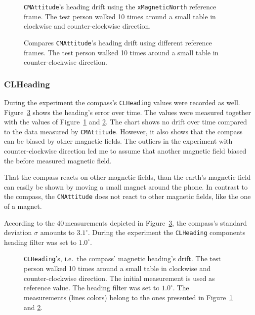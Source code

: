 \begin{figure}[htbp]
	
	\caption{\texttt{CMAttitude}'s heading drift using the \texttt{xMagneticNorth} reference frame. The test person walked 10 times around a small table in clockwise and counter-clockwise direction.}
	\label{fig:evalAttitude:xMagneticNorth}
\end{figure}

\begin{figure}[htbp]
	
	\caption{Compares \texttt{CMAttitude}'s heading drift using different reference frames. The test person walked 10 times around a small table in counter-clockwise direction.}
	\label{fig:evalAttitude:referenceframes}
\end{figure}

\subsubsection*{CLHeading}
During the experiment the compass's \texttt{CLHeading} values were recorded as well. Figure~\ref{fig:eval:compass} shows the heading's error over time. The values were measured together with the values of Figure~\ref{fig:evalAttitude:xMagneticNorth} and \ref{fig:evalAttitude:referenceframes}. The chart shows no drift over time compared to the data measured by \texttt{CMAttitude}. However, it also shows that the compass can be biased by other magnetic fields. The outliers in the experiment with counter-clockwise direction led me to assume that another magnetic field biased the before measured magnetic field.

That the compass reacts on other magnetic fields, than the earth's magnetic field can easily be shown by moving a small magnet around the phone. In contrast to the compass, the \texttt{CMAttitude} does not react to other magnetic fields, like the one of a magnet.

According to the 40\,measurements depicted in Figure~\ref{fig:eval:compass}, the compass's standard deviation $\sigma$ amounts to $3.1^{\circ}$. During the experiment the \texttt{CLHeading} components heading filter was set to $1.0^{\circ}$.


\begin{figure}[htbp]
	
	\caption{\texttt{CLHeading}'s, i.e.\ the compass' magnetic heading's drift. The test person walked 10 times around a small table in clockwise and counter-clockwise direction. The initial measurement is used as reference value. The heading filter was set to $1.0^{\circ}$. The measurements (lines colors) belong to the ones presented in Figure~\ref{fig:evalAttitude:xMagneticNorth} and \ref{fig:evalAttitude:referenceframes}.}
	\label{fig:eval:compass}
\end{figure}

